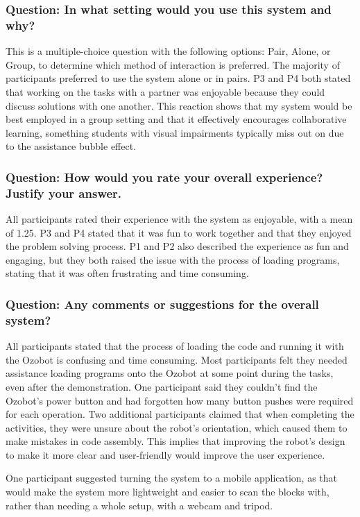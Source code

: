 \documentclass[oneside,%
                    author={Malak Hajji},
                    degree={BSc},
                    title={Designing An Accessible Computational Toolkit For Students},
                  subtitle={With Mixed Visual Abilities}]{dissertation}
\begin{document}
\subsubsection{Question: In what setting would you use this system and why?}
This is a multiple-choice question with the following options: Pair, Alone, or Group, to determine which method of interaction is preferred. 
The majority of participants preferred to use the system alone or in pairs. P3 and P4 both stated that working on the tasks with a partner was enjoyable because they could discuss solutions with one another. This reaction shows that my system would be best employed in a group setting and that it effectively encourages collaborative learning, something students with visual impairments typically miss out on due to the assistance bubble effect.

\subsubsection{Question: How would you rate your overall experience? Justify your answer.}
All participants rated their experience with the system as enjoyable, with a mean of 1.25.
P3 and P4 stated that it was fun to work together and that they enjoyed the problem solving process. P1 and P2 also described the experience as fun and engaging, but they both raised the issue with the process of loading programs, stating that it was often frustrating and time consuming. 

\subsubsection{Question: Any comments or suggestions for the overall system?}
All participants stated that the process of loading the code and running it with the Ozobot is confusing and time consuming. Most participants felt they needed assistance loading programs onto the Ozobot at some point during the tasks, even after the demonstration. One participant said they couldn't find the Ozobot's power button and had forgotten how many button pushes were required for each operation. Two additional participants claimed that when completing the activities, they were unsure about the robot's orientation, which caused them to make mistakes in code assembly. This implies that improving the robot's design to make it more clear and user-friendly would improve the user experience. 

One participant suggested turning the system to a mobile application, as that would make the system more lightweight and easier to scan the blocks with, rather than needing a whole setup, with a webcam and tripod.
\end{document}
